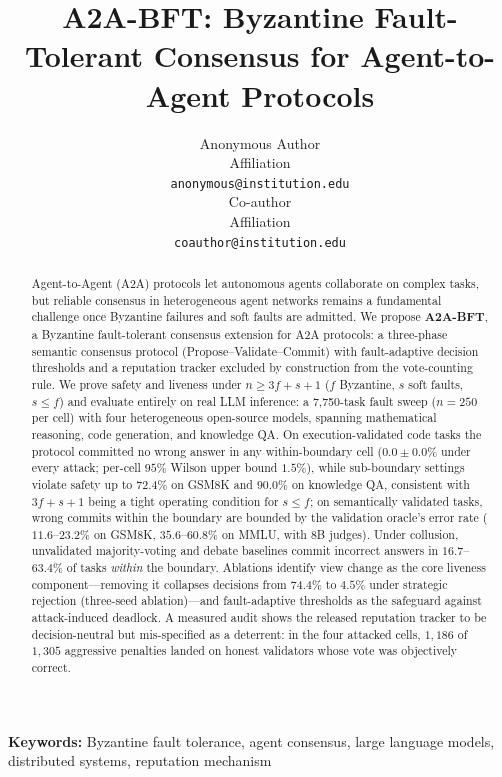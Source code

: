 \documentclass{article}
\title{A2A-BFT: Byzantine Fault-Tolerant Consensus for Agent-to-Agent Protocols}
\author{
  Anonymous Author \\
  Affiliation \\
  \texttt{anonymous@institution.edu} \\
  \AND
  Co-author \\
  Affiliation \\
  \texttt{coauthor@institution.edu}
}
\begin{document}
\maketitle

\begin{abstract}
Agent-to-Agent (A2A) protocols let autonomous agents collaborate on complex tasks, but reliable consensus in heterogeneous agent networks remains a fundamental challenge once Byzantine failures and soft faults are admitted. We propose \textbf{A2A-BFT}, a Byzantine fault-tolerant consensus extension for A2A protocols: a three-phase semantic consensus protocol (Propose--Validate--Commit) with fault-adaptive decision thresholds and a reputation tracker excluded by construction from the vote-counting rule. We prove safety and liveness under $n \geq 3f + s + 1$ ($f$ Byzantine, $s$ soft faults, $s \le f$) and evaluate entirely on real LLM inference: a 7{,}750-task fault sweep ($n{=}250$ per cell) with four heterogeneous open-source models, spanning mathematical reasoning, code generation, and knowledge QA. On execution-validated code tasks the protocol committed no wrong answer in any within-boundary cell ($0.0 \pm 0.0\%$ under every attack; per-cell $95\%$ Wilson upper bound $1.5\%$), while sub-boundary settings violate safety up to $72.4\%$ on GSM8K and $90.0\%$ on knowledge QA, consistent with $3f{+}s{+}1$ being a tight operating condition for $s \le f$; on semantically validated tasks, wrong commits within the boundary are bounded by the validation oracle's error rate ($11.6$--$23.2\%$ on GSM8K, $35.6$--$60.8\%$ on MMLU, with 8B judges). Under collusion, unvalidated majority-voting and debate baselines commit incorrect answers in $16.7$--$63.4\%$ of tasks \emph{within} the boundary. Ablations identify view change as the core liveness component---removing it collapses decisions from $74.4\%$ to $4.5\%$ under strategic rejection (three-seed ablation)---and fault-adaptive thresholds as the safeguard against attack-induced deadlock. A measured audit shows the released reputation tracker to be decision-neutral but mis-specified as a deterrent: in the four attacked cells, $1{,}186$ of $1{,}305$ aggressive penalties landed on honest validators whose vote was objectively correct.
\end{abstract}

\begin{center}
\textbf{Keywords:} Byzantine fault tolerance, agent consensus, large language models, distributed systems, reputation mechanism
\end{center}
\end{document}
